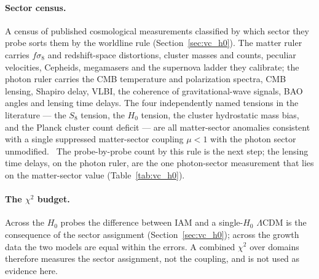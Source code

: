 \paragraph{Sector census.} A census of published cosmological measurements classified by which sector they probe sorts them by the worldline rule
(Section~\ref{sec:vc_h0}). The matter ruler carries $f\sigma_8$ and redshift-space distortions, cluster masses and counts, peculiar velocities, Cepheids,
megamasers and the supernova ladder they calibrate; the photon ruler carries the CMB temperature and polarization spectra, CMB lensing, Shapiro delay, VLBI,
the coherence of gravitational-wave signals, BAO angles and lensing time delays. The four independently named tensions in the literature --- the $S_8$
tension, the $H_0$ tension, the cluster hydrostatic mass bias, and the Planck cluster count deficit --- are all matter-sector anomalies consistent with a
single suppressed matter-sector coupling $\mu<1$ with the photon sector unmodified. \interp\ The probe-by-probe count by this rule is the next step; the
lensing time delays, on the photon ruler, are the one photon-sector measurement that lies on the matter-sector value (Table~\ref{tab:vc_h0}). \openprob

\paragraph{The $\chi^2$ budget.} Across the $H_0$ probes the difference between IAM and a single-$H_0$ $\Lambda$CDM is the consequence of the sector
assignment (Section~\ref{sec:vc_h0}); across the growth data the two models are equal within the errors. A combined $\chi^2$ over domains therefore
measures the sector assignment, not the coupling, and is not used as evidence here. \interp

